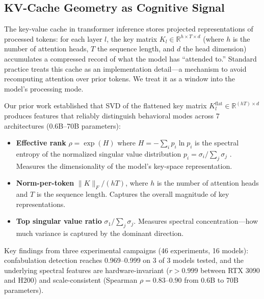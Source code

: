 \subsection{KV-Cache Geometry as Cognitive Signal}

The key-value cache in transformer inference stores projected
representations of processed tokens: for each layer $l$, the key matrix
$K_l \in \mathbb{R}^{h \times T \times d}$ (where $h$ is the number of
attention heads, $T$ the sequence length, and $d$ the head dimension)
accumulates a compressed record of what the model has ``attended to.''
Standard practice treats this cache as an implementation detail---a
mechanism to avoid recomputing attention over prior tokens. We treat it as
a window into the model's processing mode.

Our prior work \citep{lyra2026detecting} established that SVD of the
flattened key matrix $K_l^{\text{flat}} \in \mathbb{R}^{(hT) \times d}$
produces features that reliably distinguish behavioral modes across 7
architectures (0.6B--70B parameters):

\begin{itemize}[nosep]
  \item \textbf{Effective rank} $\rho = \exp(H)$ where
    $H = -\sum_i p_i \ln p_i$ is the spectral entropy of the normalized
    singular value distribution $p_i = \sigma_i / \sum_j \sigma_j$
    \citep{roy2007effective}. Measures the dimensionality of the
    model's key-space representation.
  \item \textbf{Norm-per-token} $\|K\|_F / (hT)$, where $h$ is the
    number of attention heads and $T$ is the sequence length. Captures
    the overall magnitude of key representations.
  \item \textbf{Top singular value ratio} $\sigma_1 / \sum_j \sigma_j$.
    Measures spectral concentration---how much variance is captured by
    the dominant direction.
\end{itemize}

Key findings from three experimental campaigns (46 experiments, 16 models):
confabulation detection reaches 0.969--0.999 on 3 of 3 models tested, and
the underlying spectral features are hardware-invariant ($r > 0.999$
between RTX 3090 and H200) and scale-consistent (Spearman
$\rho = 0.83$--$0.90$ from 0.6B to 70B parameters).

